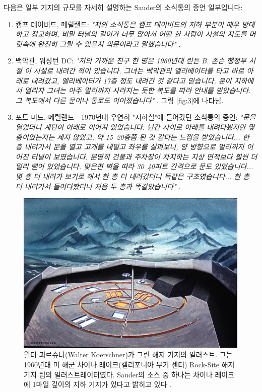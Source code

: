 \documentclass[10pt,twocolumn,letterpaper]{article}
\begin{document}
다음은 일부 기지의 규모를 자세히 설명하는 Sauder의 소식통의 증언 일부입니다:

\begin{flushleft}
\begin{enumerate}
    \item 캠프 데이비드, 메릴랜드: \textit{"저의 소식통은 캠프 데이비드의 지하 부분이 매우 방대하고 정교하며, 비밀 터널의 길이가 너무 많아서 어떤 한 사람이 시설의 지도를 머릿속에 완전히 그릴 수 있을지 의문이라고 말했습니다"} \cite{22}.
    \item 백악관, 워싱턴 DC: \textit{"저의 가까운 친구 한 명은 1960년대 린든 B. 존슨 행정부 시절 이 시설로 내려간 적이 있습니다. 그녀는 백악관의 엘리베이터를 타고 바로 아래로 내려갔고, 엘리베이터가 17층 정도 내려간 것 같다고 믿습니다. 문이 지하에서 열리자 그녀는 아주 멀리까지 사라지는 듯한 복도를 따라 안내를 받았습니다. 그 복도에서 다른 문이나 통로도 이어졌습니다"} \cite{22}. 그림 \ref{fig:3}에 나타남.
    \item 포트 미드, 메릴랜드 - 1970년대 우연히 "지하실"에 들어갔던 소식통의 증언: \textit{"문을 열었더니 계단이 아래로 이어져 있었습니다. 난간 사이로 아래를 내려다봤지만 몇 층이었는지는 세지 않았고, 약 15~20층쯤 된 것 같다는 느낌을 받았습니다... 한 층 내려가서 문을 열고 고개를 내밀고 좌우를 살펴보니, 양 방향으로 멀리까지 이어진 터널이 보였습니다. 분명히 건물과 주차장이 차지하는 지상 면적보다 훨씬 더 멀리 뻗어 있었습니다. 맞은편 벽을 따라 30~40피트 간격으로 문도 있었습니다... 몇 층 더 내려가 보기로 해서 한 층 더 내려갔더니 똑같은 구조였습니다... 한 층 더 내려가서 들여다봤더니 처음 두 층과 똑같았습니다"} \cite{22}.
\end{enumerate}
\end{flushleft}

\begin{figure}[t]
\begin{center}
   \includegraphics[width=1\linewidth]{undersea.jpg}
\end{center}
   \caption{월터 쾨르슈너(Walter Koerschner)가 그린 해저 기지의 일러스트. 그는 1960년대 미 해군 차이나 레이크(캘리포니아 무기 센터) Rock-Site 해저 기지 팀의 일러스트레이터였다. Sauder의 소스 중 하나는 차이나 레이크에 1마일 깊이의 지하 기지가 있다고 밝히고 있다 \cite{22,23}.}
\label{fig:5}
\label{fig:onecol}
\end{figure}
\end{document}
